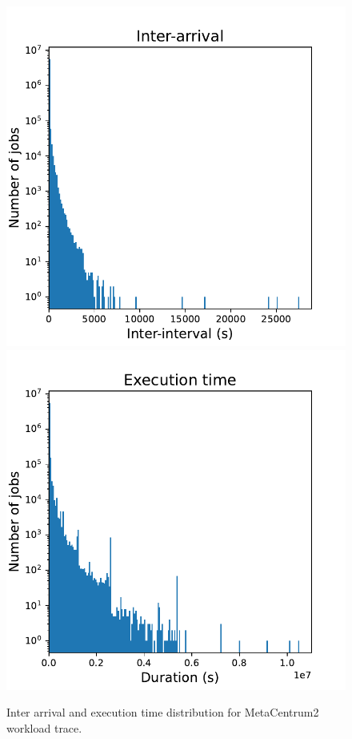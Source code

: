 \begin{figure}[!htb]
    \centering
    \includegraphics[scale=0.55]{Images/Model/interarrival.pdf}
    \includegraphics[scale=0.55]{Images/Model/execution_time.pdf}
    \caption{Inter arrival and execution time distribution for MetaCentrum2 workload trace.}
    \label{fig:metacentrum}
\end{figure}

